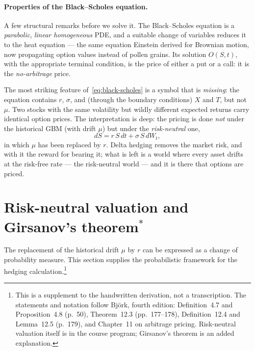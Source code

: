 \paragraph*{Properties of the Black--Scholes equation.}

A few structural remarks before we solve it.
The Black--Scholes equation is a \emph{parabolic}, \emph{linear homogeneous} PDE, and a suitable change of variables reduces it to the heat equation --- the same equation Einstein derived for Brownian motion, now propagating option values instead of pollen grains.
Its solution $O(S,t)$, with the appropriate terminal condition, is the price of either a put or a call: it is the \emph{no-arbitrage} price.

The most striking feature of~\eqref{eq:black-scholes} is a symbol that is \emph{missing}: the equation contains $r$, $\sigma$, and (through the boundary conditions) $X$ and $T$, but not $\mu$.
Two stocks with the same volatility but wildly different expected returns carry identical option prices.
The interpretation is deep: the pricing is done \emph{not} under the historical GBM (with drift $\mu$) but under the \emph{risk-neutral} one,
\begin{equation}
dS = r\, S\, dt + \sigma\, S\, dW_t,
\end{equation}
in which $\mu$ has been replaced by $r$.
Delta hedging removes the market risk, and with it the reward for bearing it; what is left is a world where every asset drifts at the risk-free rate --- the risk-neutral world --- and it is there that options are priced.


\section[Risk-neutral valuation and Girsanov's theorem*]{Risk-neutral valuation and Girsanov's theorem\texorpdfstring{$^*$}{*}}
\label{sec:rn-girsanov}
The replacement of the historical drift $\mu$ by $r$ can be expressed as a change of probability measure.
This section supplies the probabilistic framework for the hedging calculation.\footnote{This is a supplement to the handwritten derivation, not a transcription.
The statements and notation follow Bj\"ork, fourth edition\cite{Bjork2020}: Definition~4.7 and Proposition~4.8 (p.~50), Theorem~12.3 (pp.~177--178), Definition~12.4 and Lemma~12.5 (p.~179), and Chapter~11 on arbitrage pricing.
Risk-neutral valuation itself is in the course program; Girsanov's theorem is an added explanation.}

